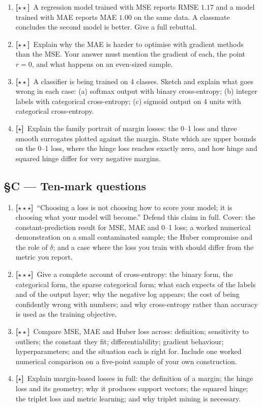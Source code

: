 \documentclass[11pt,a4paper]{article}
\newcommand{\LA}{{\footnotesize\textbf{[$\star\star\star$]}}}
\newcommand{\LB}{{\footnotesize\textbf{[$\star\star$]}}}
\newcommand{\LC}{{\footnotesize\textbf{[$\star$]}}}
\newcommand{\Q}[1]{\item[\textbf{#1}]}
\begin{document}
\begin{enumerate}[leftmargin=2.2cm]
  (b) $d(a,p) = 0.4$, $d(a,n) = 2.1$, $\alpha = 1.0$;
  (c) $d(a,p) = 1.2$, $d(a,n) = 1.4$, $\alpha = 0.5$.
  For each, state whether the triplet produces a gradient, and explain what
  case (b) implies about sampling triplets at random.
\Q{U2.26}\LB\ A regression model trained with MSE reports RMSE $1.17$ and a
  model trained with MAE reports MAE $1.00$ on the same data. A classmate
  concludes the second model is better. Give a full rebuttal.
\Q{U2.27}\LB\ Explain why the MAE is harder to optimise with gradient methods
  than the MSE. Your answer must mention the gradient of each, the point
  $r = 0$, and what happens on an even-sized sample.
\Q{U2.28}\LB\ A classifier is being trained on 4 classes. Sketch and explain
  what goes wrong in each case: (a) softmax output with binary cross-entropy;
  (b) integer labels with categorical cross-entropy; (c) sigmoid output on 4
  units with categorical cross-entropy.
\Q{U2.29}\LC\ Explain the family portrait of margin losses: the 0--1 loss and
  three smooth surrogates plotted against the margin. State which are upper
  bounds on the 0--1 loss, where the hinge loss reaches exactly zero, and how
  hinge and squared hinge differ for very negative margins.
\end{enumerate}

\subsection*{§C --- Ten-mark questions}

\begin{enumerate}[leftmargin=2.2cm]
\Q{U2.30}\LA\ ``Choosing a loss is not choosing how to score your model; it is
  choosing what your model will become.'' Defend this claim in full. Cover: the
  constant-prediction result for MSE, MAE and 0--1 loss; a worked numerical
  demonstration on a small contaminated sample; the Huber compromise and the
  role of $\delta$; and a case where the loss you train with should differ from
  the metric you report.
\Q{U2.31}\LA\ Give a complete account of cross-entropy: the binary form, the
  categorical form, the sparse categorical form; what each expects of the
  labels and of the output layer; why the negative log appears; the cost of
  being confidently wrong with numbers; and why cross-entropy rather than
  accuracy is used as the training objective.
\Q{U2.32}\LB\ Compare MSE, MAE and Huber loss across: definition; sensitivity
  to outliers; the constant they fit; differentiability; gradient behaviour;
  hyperparameters; and the situation each is right for. Include one worked
  numerical comparison on a five-point sample of your own construction.
\Q{U2.33}\LC\ Explain margin-based losses in full: the definition of a margin;
  the hinge loss and its geometry; why it produces support vectors; the squared
  hinge; the triplet loss and metric learning; and why triplet mining is
  necessary.
\end{enumerate}
\end{document}
